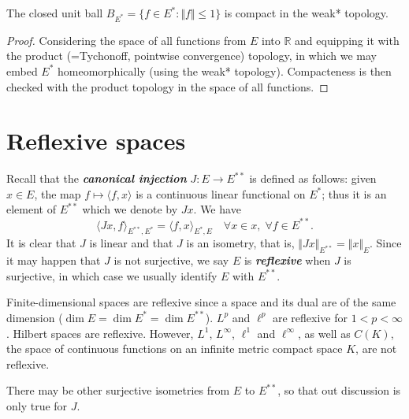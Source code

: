 \documentclass{article}
\theoremstyle{definition}
\numberwithin{equation}{section}
\newcommand{\R}{\mathbb{R}}
\begin{document}
\begin{thm}\label{BAB}
	The closed unit ball $B_{E^*}=\{f\in E^*:\Vert f\Vert\leq1\}$ is compact in the weak* topology.
\end{thm}
\begin{proof}
	Considering the space of all functions from $E$ into $\R$ and equipping it with the product (=Tychonoff, pointwise convergence) topology, in which we may embed $E^*$ homeomorphically (using the weak* topology). Compacteness is then checked with the product topology in the space of all functions.
\end{proof}

\section{Reflexive spaces}
Recall that the \textbf{\textit{canonical injection}} $J:E\to E^{**}$ is defined as follows: given $x\in E$, the map $f\mapsto\langle f,x\rangle$ is a continuous linear functional on $E^*$; thus it is an element of $E^{**}$ which we denote by $Jx$. We have
\[\langle Jx,f\rangle_{E^{**},E^*}=\langle f,x\rangle_{E^*,E}\quad\forall x\in x,\;\forall f\in E^{**}.\]
It is clear that $J$ is linear and that $J$ is an isometry, that is, $\Vert Jx\Vert_{E^{**}}=\Vert x\Vert_E$. Since it may happen that $J$ is not surjective, we say $E$ is \textbf{\textit{reflexive}} when $J$ is surjective, in which case we usually identify $E$ with $E^{**}$.

\begin{remark}
	Finite-dimensional spaces are reflexive since a space and its dual are of the same dimension ($\dim E=\dim E^*=\dim E^{**}$). $L^p$ and $\ell^p$ are reflexive for $1<p<\infty$. Hilbert spaces are reflexive. However, $L^1$, $L^\infty$, $\ell^1$ and $\ell^\infty$, as well as $C(K)$, the space of continuous functions on an infinite metric compact space $K$, are not reflexive.
\end{remark}
\begin{remark}
	There may be other surjective isometries from $E$ to $E^{**}$, so that out discussion is only true for $J$.
\end{remark}
\end{document}
